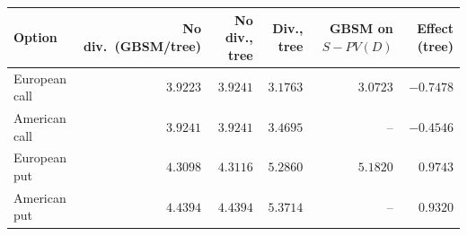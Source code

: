 \begin{tabular}{lrrrrr}
\toprule
Option & No div.\ (GBSM/tree) & No div., tree & Div., tree & GBSM on $S-PV(D)$ & Effect (tree) \\
\midrule
European call & $3.9223$ & $3.9241$ & $3.1763$ & $3.0723$ & $-0.7478$ \\
American call & $3.9241$ & $3.9241$ & $3.4695$ & -- & $-0.4546$ \\
European put & $4.3098$ & $4.3116$ & $5.2860$ & $5.1820$ & $0.9743$ \\
American put & $4.4394$ & $4.4394$ & $5.3714$ & -- & $0.9320$ \\
\bottomrule
\end{tabular}
